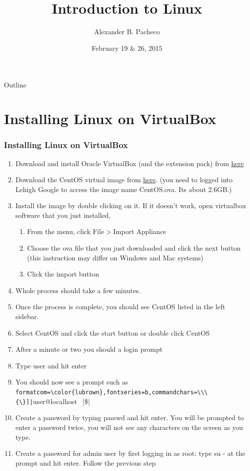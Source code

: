 \documentclass[10pt,t]{beamer}
\title{Introduction to Linux}
\author{Alexander B. Pacheco}
\institute{\href{http://researchcomputing.lehigh.edu}{LTS Research Computing}}%
\date{February 19 \& 26, 2015}
\begin{document}
\begin{frame}[c]
  \titlepage
\end{frame}

\footnotesize
\begin{frame}{Outline}
  \tableofcontents
\end{frame}

\section*{Installing Linux on VirtualBox}
\begin{frame}[fragile]
  \frametitle{Installing Linux on VirtualBox}
  \begin{enumerate}
    \item Download and install Oracle VirtualBox (and the extension pack) from \href{https://www.virtualbox.org/wiki/Downloads}{here}
    \item Download the CentOS virtual image from \href{https://drive.google.com/open?id=0ByziB2zqYhHVcHRKTWZqdFZUX0E&authuser=1}{here}. (you need to logged into Lehigh Google to access the image name CentOS.ova. Its about 2.6GB.)
    \item Install the image by double clicking on it. If it doesn't work, open virtualbox software that you just installed, 
    \begin{enumerate}
      \item From the menu, click File$>$Import Appliance
      \item Choose the ova file that you just downloaded and click the next button (this instruction may differ on Windows and Mac systems)
      \item Click the import button
    \end{enumerate}	
    \item Whole process should take a few minutes.
    \item Once the process is complete, you should see CentOS listed in the left sidebar.
    \item Select CentOS and click the start button or double click CentOS
    \item After a minute or two you should a login prompt
    \item Type user and hit enter
    \item You should now see a prompt such as \Verb[formatcom=\color{lubrown},fontseries=b,commandchars=\\\{\}]|[user@localhost ~]\$|
    \item Create a password by typing passwd and hit enter. You will be prompted to enter a password twice, you will not see any characters on the screen as you type.
    \item Create a password for admin user by first logging in as root: type su - at the prompt and hit enter. Follow the previous step
  \end{enumerate}
\end{frame}
\end{document}
